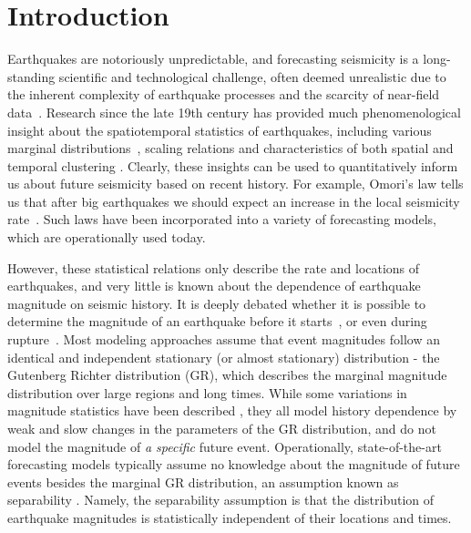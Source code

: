 \documentclass[pdflatex]{sn-jnl}
\begin{document}
\section{Introduction} \label{sec:introduction}
Earthquakes are notoriously unpredictable, and forecasting seismicity is a long-standing scientific and technological challenge, often deemed unrealistic due to the inherent complexity of earthquake processes and the scarcity of near-field data~\cite{bernard_earthquake_1999, geller_earthquakes_1997}. 
Research since the late 19th century has provided much phenomenological insight about the spatiotemporal statistics of earthquakes, including various marginal distributions~\cite{gutenberg_frequency_1944, kagan_seismic_2002}, scaling relations \cite{bak_earthquakes_1989, dascher-cousineau_what_2020, kagan_aftershock_2002, utsu_centenary_1995} and characteristics of both spatial and temporal clustering \cite{omori_after-shocks_1894, kagan_short-term_2004, ben-zion_localization_2020, devries_deep_2018, king_static_1994}. Clearly, these insights can be used to quantitatively inform us about future seismicity based on recent history. For example, Omori's law tells us that after big earthquakes we should expect an increase in the local seismicity rate~\cite{omori_after-shocks_1894}. Such laws have been incorporated into a variety of forecasting models, which are operationally used today\cite{ogata_statistical_1988, hardebeck_aftershock_2024, jordan_operational_2011, stirling_national_2012}.

However, these statistical relations only describe the rate and locations of earthquakes, and very little is known about the dependence of earthquake magnitude on seismic history.
It is deeply debated whether it is possible to determine the magnitude of an earthquake before it starts~\cite{kagan_seismic_2002, ogata_exploring_2018}, or even during rupture~\cite{ellsworth_seismic_1995, meier_evidence_2016}.
Most modeling approaches assume that event magnitudes follow an identical and independent stationary (or almost stationary) distribution - the Gutenberg Richter distribution (GR), which describes the marginal magnitude distribution over large regions and long times. 
While some variations in magnitude statistics have been described \cite{gulia_real-time_2019, nandan_magnitude_2019}, they all model history dependence by weak and slow changes in the parameters of the GR distribution, and do not model the magnitude of \textit{a specific} future event. Operationally, state-of-the-art forecasting models typically assume no knowledge about the magnitude of future events besides the marginal GR distribution, an assumption known as separability \cite{schoenberg_testing_2004}. Namely, the separability assumption is that the distribution of earthquake magnitudes is statistically independent of their locations and times.
\end{document}
